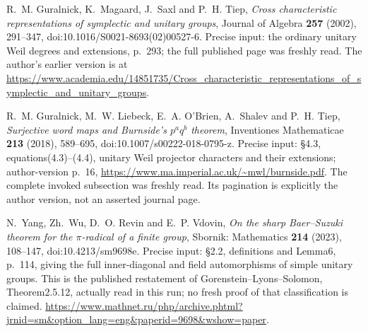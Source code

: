 R.~M. Guralnick, K.~Magaard, J.~Saxl and P.~H. Tiep,
\emph{Cross characteristic representations of symplectic and unitary groups},
Journal of Algebra \textbf{257} (2002), 291--347,
doi:10.1016/S0021-8693(02)00527-6.
Precise input: the ordinary unitary Weil degrees and extensions,
p.~293; the full published page was freshly read. The author's
earlier version is at
\url{https://www.academia.edu/14851735/Cross_characteristic_representations_of_symplectic_and_unitary_groups}.

R.~M. Guralnick, M.~W. Liebeck, E.~A. O'Brien, A.~Shalev and P.~H. Tiep,
\emph{Surjective word maps and Burnside's $p^aq^b$ theorem},
Inventiones Mathematicae \textbf{213} (2018), 589--695,
doi:10.1007/s00222-018-0795-z.
Precise input: \S4.3, equations(4.3)--(4.4), unitary Weil
projector characters and their extensions; author-version p.~16,
\url{https://www.ma.imperial.ac.uk/~mwl/burnside.pdf}.
The complete invoked subsection was freshly read. Its pagination
is explicitly the author version, not an asserted journal page.

N.~Yang, Zh.~Wu, D.~O. Revin and E.~P. Vdovin,
\emph{On the sharp Baer--Suzuki theorem for the $\pi$-radical
of a finite group}, Sbornik: Mathematics \textbf{214} (2023),
108--147, doi:10.4213/sm9698e.
Precise input: \S2.2, definitions and Lemma6, p.~114,
giving the full inner-diagonal and field automorphisms of
simple unitary groups. This is the published restatement
of Gorenstein--Lyons--Solomon, Theorem2.5.12, actually read
in this run; no fresh proof of that classification is claimed.
\url{https://www.mathnet.ru/php/archive.phtml?jrnid=sm&option_lang=eng&paperid=9698&wshow=paper}.
